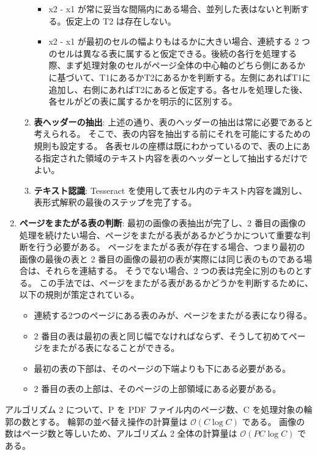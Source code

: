 \documentclass[uplatex, twocolumn,10pt]{jsarticle}
\begin{document}
\begin{enumerate}
\begin{enumerate}
\begin{itemize}
            \item x2 - x1 が常に妥当な間隔内にある場合、並列した表はないと判断する。仮定上の T2 は存在しない。
            \item x2 - x1 が最初のセルの幅よりもはるかに大きい場合、連続する 2 つのセルは異なる表に属すると仮定できる。後続の各行を処理する際、まず処理対象のセルがページ全体の中心軸のどちら側にあるかに基づいて、T1にあるかT2にあるかを判断する。左側にあればT1に追加し、右側にあればT2にあると仮定する。各セルを処理した後、各セルがどの表に属するかを明示的に区別する。
        \end{itemize}
        \item \textbf{表ヘッダーの抽出}:
        上述の通り、表のヘッダーの抽出は常に必要であると考えられる。
        そこで、表の内容を抽出する前にそれを可能にするための規則も設定する。
        各表セルの座標は既にわかっているので、表の上にある指定された領域のテキスト内容を表のヘッダーとして抽出するだけでよい。
        \item \textbf{テキスト認識}:
        Tesseract を使用して表セル内のテキスト内容を識別し、表形式解釈の最後のステップを完了する。
    \end{enumerate}
    \item \textbf{ページをまたがる表の判断}:
    最初の画像の表抽出が完了し、2 番目の画像の処理を続けたい場合、ページをまたがる表があるかどうかについて重要な判断を行う必要がある。
    ページをまたがる表が存在する場合、つまり最初の画像の最後の表と 2 番目の画像の最初の表が実際には同じ表のものである場合は、それらを連結する。
    そうでない場合、2 つの表は完全に別のものとする。
    この手法では、ページをまたがる表があるかどうかを判断するために、以下の規則が策定されている。
    \begin{itemize}
        \item 連続する2つのページにある表のみが、ページをまたがる表になり得る。
        \item 2 番目の表は最初の表と同じ幅でなければならず、そうして初めてページをまたがる表になることができる。
        \item 最初の表の下部は、そのページの下端よりも下にある必要がある。
        \item 2 番目の表の上部は、そのページの上部領域にある必要がある。
    \end{itemize}
\end{enumerate}

アルゴリズム 2 について、P を PDF ファイル内のページ数、C を処理対象の輪郭の数とする。
輪郭の並べ替え操作の計算量は $\mathcal{O} (C \log C)$ である。
画像の数はページ数と等しいため、アルゴリズム 2 全体の計算量は $\mathcal{O} (PC \log C)$ である。
\end{document}
